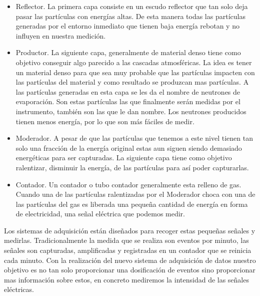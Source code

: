 	\begin{itemize}
		\item   Reflector. La primera capa consiste en un escudo reflector que tan solo deja pasar las partículas con energías altas. De 
		        esta manera todas las partículas generadas por el entorno inmediato que tienen baja energía rebotan y no influyen en nuestra 
			medición. 
		\item   Productor. La siguiente capa, generalmente de material denso tiene como objetivo conseguir algo parecido a las cascadas 
		        atmosféricas. La idea es tener un material denso para que sea muy probable que las partículas impacten con las partículas 
			del material y como resultado se produzcan mas partículas. A las partículas generadas en esta capa se les da el nombre de
			neutrones de evaporación. Son estas partículas las que finalmente serán medidas por el instrumento, también son las que le dan
			nombre. Los neutrones producidos tienen menos energía, por lo que son más fáciles de medir. 
		\item   Moderador. A pesar de que las partículas que tenemos a este nivel tienen tan solo una fracción de la energía original estas
		        aun siguen siendo demasiado energéticas para ser capturadas. La siguiente capa tiene como objetivo ralentizar, disminuir 
			la energía, de las partículas para así poder capturarlas.
		\item   Contador. Un contador o tubo contador generalmente esta relleno de gas. Cuando una de las partículas ralentizadas por el 
		        Moderador choca con una de las partículas del gas es liberada una pequeña cantidad de energía en forma de electricidad, 
			una señal eléctrica que podemos medir.
      	\end{itemize}
	Los sistemas de adquisición están diseñados para recoger estas pequeñas señales y medirlas. Tradicionalmente la medida que se realiza son 
	eventos por minuto, las señales son capturadas, amplificadas y registradas en un contador que se reinicia cada minuto. Con la realización
	del nuevo sistema de adquisición de datos nuestro objetivo es no tan solo proporcionar una dosificación de eventos sino proporcionar mas 
	información sobre estos, en concreto mediremos la intensidad de las señales eléctricas. 


